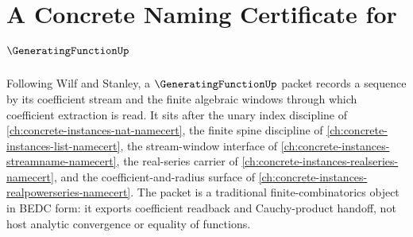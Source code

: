 \chapter{A Concrete Naming Certificate for $\GeneratingFunctionUp$}
\label{ch:concrete-instances-generating-function-namecert}

Following Wilf and Stanley, a $\GeneratingFunctionUp$ packet records a sequence by its coefficient stream and the finite algebraic windows through which coefficient extraction is read. It sits after the unary index discipline of \autoref{ch:concrete-instances-nat-namecert}, the finite spine discipline of \autoref{ch:concrete-instances-list-namecert}, the stream-window interface of \autoref{ch:concrete-instances-streamname-namecert}, the real-series carrier of \autoref{ch:concrete-instances-realseries-namecert}, and the coefficient-and-radius surface of \autoref{ch:concrete-instances-realpowerseries-namecert}. The packet is a traditional finite-combinatorics object in BEDC form: it exports coefficient readback and Cauchy-product handoff, not host analytic convergence or equality of functions.


